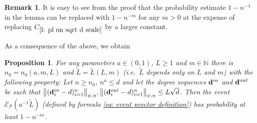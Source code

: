 \documentclass[12pt]{article}
\newtheorem{prop}[theorem]{Proposition}
\theoremstyle{definition}
\newtheorem{Remark}[theorem]{Remark}
\theoremstyle{plain}
\newcommand{\N}{\mathbb{N}}
\newcommand{\Event}{\mathcal{E}}
\def\InDeg{{\bf d}^{in}}
\def\OutDeg{{\bf d}^{out}}
\def\pvector{{\mathcal P}}
\begin{document}
\begin{Remark}\label{r: pvector probability power}
It is easy to see from the proof that the probability estimate $1-n^{-1}$ in the lemma
can be replaced with $1-n^{-m}$ for any $m>0$ at the expense of replacing
$C_{\ref{l: pl on sqrt d scale}}$ by a larger constant. 
\end{Remark}


As a consequence of the above, we obtain

\begin{prop}\label{p: bounds for pvector}
For any parameters $a\in(0,1)$, $L\geq 1$ and $m\in\N$ there is $n_0=n_0(a,m,L)$ and
$\widetilde L=\widetilde L(L,m)$ (i.e.\ $\widetilde L$ depends only on $L$ and $m$) with the following property:
Let $n\geq n_0$, $n^a\leq d$ and let the degree sequences $\InDeg$ and $\OutDeg$
be such that
$\bigl\|(\InDeg_i-d)_{i=1}^n\bigr\|_{\psi,n},\bigl\|(\OutDeg_i-d)_{i=1}^n\bigr\|_{\psi,n}\leq L\sqrt{d}$. 
Then the event $\Event_\pvector(a^{-1}\widetilde L)$
(defined by formula \eqref{eq: event pvector definition})
has probability at least $1-n^{-m}$.
\end{prop}
\end{document}
